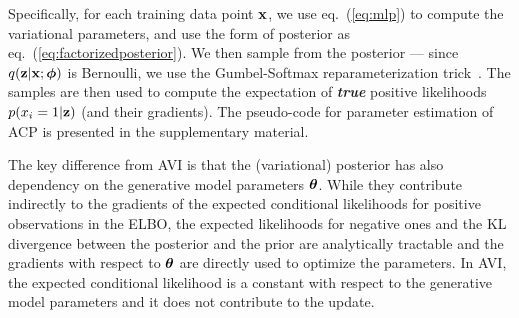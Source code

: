 Specifically, for each training data point $\mathbf{x}$, we use eq.~(\ref{eq:mlp}) to compute the variational parameters, and use the form of posterior as eq.~(\ref{eq:factorizedposterior}). We then sample from the posterior --- since $q(\mathbf{z}|\mathbf{x}; \bm{\phi})$ is Bernoulli, we use the Gumbel-Softmax reparameterization trick~\citep{jang2016categorical}. 
The samples are then used to compute the expectation of \emph{\textbf{true}} positive likelihoods $p(x_i=1|\mathbf{z})$ (and their gradients). The pseudo-code for parameter estimation of ACP is presented in the supplementary material.



The key difference from AVI is that the (variational) posterior has also dependency on the generative model parameters $\bm{\theta}$. While they contribute indirectly to the gradients of the expected conditional likelihoods for positive observations in the ELBO, the expected likelihoods for negative ones and the KL divergence between the posterior and the prior are analytically tractable and the gradients with respect to $\bm{\theta}$ are directly used to optimize the parameters. In AVI, the expected conditional likelihood is a constant with respect to the generative model parameters and it does not contribute to the update.

\begin{table}[t]
\centering
\caption{\small Contrast of variational inference approaches}
\label{tab: methods}
\centering
\vspace{-1em}
\end{table}

